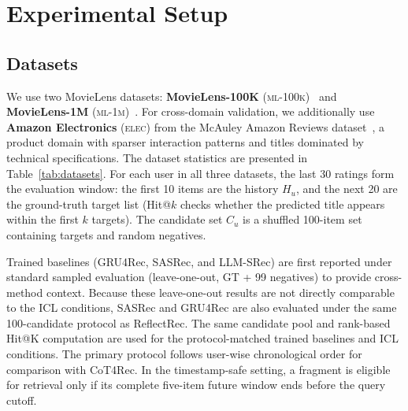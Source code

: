 \documentclass[11pt]{article}
\begin{document}
\section{Experimental Setup}
\label{sec:setup}

\subsection{Datasets}
We use two MovieLens datasets: \textbf{MovieLens-100K} (\textsc{ml-100k})~\citep{ml100k} and \textbf{MovieLens-1M} (\textsc{ml-1m})~\citep{ml100k}. For cross-domain validation, we additionally use \textbf{Amazon Electronics} (\textsc{elec}) from the McAuley Amazon Reviews dataset~\citep{he2016amazon}, a product domain with sparser interaction patterns and titles dominated by technical specifications. The dataset statistics are presented in Table~\ref{tab:datasets}. For each user in all three datasets, the last 30 ratings form the evaluation window: the first 10 items are the history $H_u$, and the next 20 are the ground-truth target list (Hit@$k$ checks whether the predicted title appears within the first $k$ targets). The candidate set $C_u$ is a shuffled 100-item set containing targets and random negatives.

Trained baselines (GRU4Rec, SASRec, and LLM-SRec) are first reported under standard sampled evaluation (leave-one-out, GT + 99 negatives) to provide cross-method context. Because these leave-one-out results are not directly comparable to the ICL conditions, SASRec and GRU4Rec are also evaluated under the same 100-candidate protocol as ReflectRec. The same candidate pool and rank-based Hit@K computation are used for the protocol-matched trained baselines and ICL conditions. The primary protocol follows user-wise chronological order for comparison with CoT4Rec. In the timestamp-safe setting, a fragment is eligible for retrieval only if its complete five-item future window ends before the query cutoff.

\begin{table}[!t]
\centering
\small
{}
\caption{Dataset statistics. ML-100K and ML-1M are GroupLens originals; Elec.\ is a 1{,}500-user subset of Amazon Electronics (McAuley) sampled from users with $\ge 30$ ratings. \#Items is the item universe spanned by the test pool; \#Inter is the evaluation-window interaction count ($1{,}500 \times (10 + 20)$).}
\label{tab:datasets}
\end{table}
\end{document}
